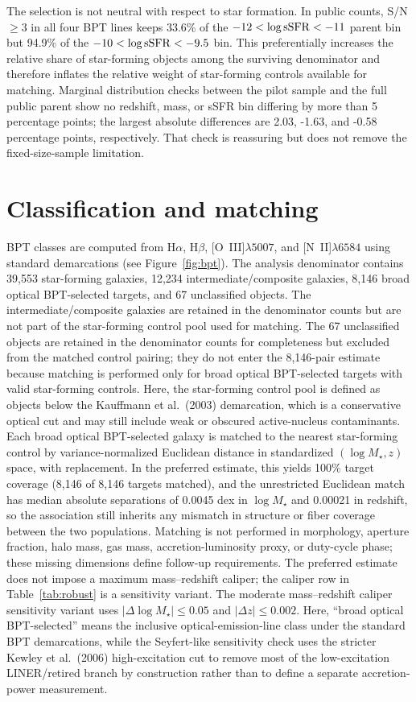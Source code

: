 \documentclass[twocolumn]{aastex631}
\begin{document}
The selection is not neutral with respect to star formation. In public counts, S/N$\geq3$ in all four BPT lines keeps 33.6\% of the $-12<\log {\rm sSFR}<-11$ parent bin but 94.9\% of the $-10<\log {\rm sSFR}<-9.5$ bin. This preferentially increases the relative share of star-forming objects among the surviving denominator and therefore inflates the relative weight of star-forming controls available for matching. Marginal distribution checks between the pilot sample and the full public parent show no redshift, mass, or sSFR bin differing by more than 5 percentage points; the largest absolute differences are 2.03, -1.63, and -0.58 percentage points, respectively. That check is reassuring but does not remove the fixed-size-sample limitation.

\section{Classification and matching}
BPT classes are computed from H$\alpha$, H$\beta$, [O~III]$\lambda5007$, and [N~II]$\lambda6584$ using standard demarcations \citep{baldwin1981,kewley2001,kauffmann2003bpt,kewley2006} (see Figure~\ref{fig:bpt}). The analysis denominator contains 39,553 star-forming galaxies, 12,234 intermediate/composite galaxies, 8,146 broad optical BPT-selected targets, and 67 unclassified objects. The intermediate/composite galaxies are retained in the denominator counts but are not part of the star-forming control pool used for matching. The 67 unclassified objects are retained in the denominator counts for completeness but excluded from the matched control pairing; they do not enter the 8,146-pair estimate because matching is performed only for broad optical BPT-selected targets with valid star-forming controls. Here, the star-forming control pool is defined as objects below the Kauffmann et al.\ (2003) demarcation, which is a conservative optical cut and may still include weak or obscured active-nucleus contaminants. Each broad optical BPT-selected galaxy is matched to the nearest star-forming control by variance-normalized Euclidean distance in standardized $(\log M_\star,z)$ space, with replacement. In the preferred estimate, this yields 100\% target coverage (8,146 of 8,146 targets matched), and the unrestricted Euclidean match has median absolute separations of 0.0045 dex in $\log M_\star$ and 0.00021 in redshift, so the association still inherits any mismatch in structure or fiber coverage between the two populations. Matching is not performed in morphology, aperture fraction, halo mass, gas mass, accretion-luminosity proxy, or duty-cycle phase; these missing dimensions define follow-up requirements. The preferred estimate does not impose a maximum mass--redshift caliper; the caliper row in Table~\ref{tab:robust} is a sensitivity variant. The moderate mass--redshift caliper sensitivity variant uses $|\Delta\log M_\star|\leq0.05$ and $|\Delta z|\leq0.002$.
Here, ``broad optical BPT-selected'' means the inclusive optical-emission-line class under the standard BPT demarcations, while the Seyfert-like sensitivity check uses the stricter Kewley et al.\ (2006) high-excitation cut to remove most of the low-excitation LINER/retired branch by construction rather than to define a separate accretion-power measurement.
\end{document}
